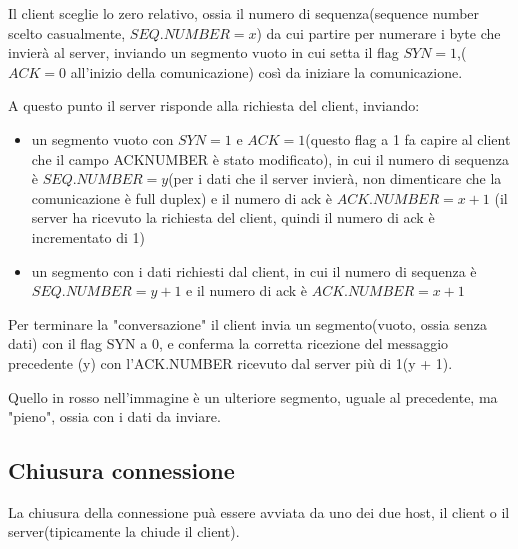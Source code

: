 Il client sceglie lo zero relativo, ossia il numero di sequenza(sequence number scelto casualmente, $SEQ.NUMBER = x$) da cui partire per numerare i byte che invierà al server, inviando un segmento vuoto in cui setta il flag $SYN = 1$,($ACK = 0$ all'inizio della comunicazione) così da iniziare la comunicazione.

A questo punto il server risponde alla richiesta del client, inviando:
\begin{itemize}
    \item un segmento vuoto con $SYN = 1$ e $ACK = 1$(questo flag a 1 fa capire al client che il campo ACKNUMBER è stato modificato), in cui il numero di sequenza è $SEQ.NUMBER = y$(per i dati che il server invierà, non dimenticare che la comunicazione è full duplex) e il numero di ack è $ACK.NUMBER = x + 1$ (il server ha ricevuto la richiesta del client, quindi il numero di ack è incrementato di 1)
    \item un segmento con i dati richiesti dal client, in cui il numero di sequenza è $SEQ.NUMBER = y + 1$ e il numero di ack è $ACK.NUMBER = x + 1$
\end{itemize}

 

Per terminare la "conversazione" il client invia un segmento(vuoto, ossia senza dati) con il flag SYN a 0, e conferma la corretta ricezione del messaggio precedente (y) con l'ACK.NUMBER ricevuto dal server più di 1(y + 1).

Quello in rosso nell'immagine è un ulteriore segmento, uguale al precedente, ma "pieno", ossia con i dati da inviare.

\subsection{Chiusura connessione}
La chiusura della connessione puà essere avviata da uno dei due host, il client o il server(tipicamente la chiude il client).

